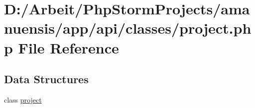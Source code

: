 \hypertarget{project_8php}{}\section{D\+:/\+Arbeit/\+Php\+Storm\+Projects/amanuensis/app/api/classes/project.php File Reference}
\label{project_8php}
\subsection*{Data Structures}
\begin{DoxyCompactItemize}
\item 
class \hyperlink{classproject}{project}
\end{DoxyCompactItemize}
